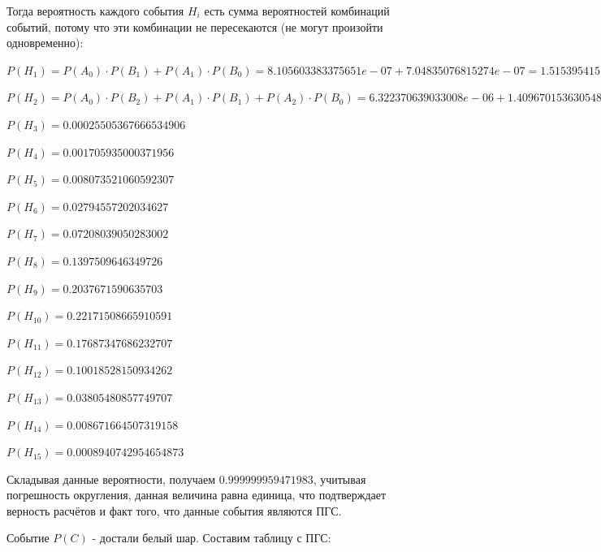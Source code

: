 \begin{enumerate}
	Тогда вероятность каждого события $H_i$ есть сумма вероятностей комбинаций событий, потому что эти комбинации не пересекаются (не могут произойти одновременно):
	
	$P(H_1) = P(A_0) \cdot P(B_1) + P(A_1) \cdot P(B_0) = 8.105603383375651e-07 + 7.04835076815274e-07 = 1.515395415152839e-06$
	
	$P(H_2) = P(A_0) \cdot P(B_2) + P(A_1) \cdot P(B_1) + P(A_2) \cdot P(B_0) = 6.322370639033008e-06 + 1.409670153630548e-05 + 5.0366339864091445e-06 = 2.5455706161747633e-05$
	
	$P(H_3) = 0.00025505367666534906$
	
	$P(H_4) = 0.001705935000371956$
	
	$P(H_5) = 0.008073521060592307$
	
	$P(H_6) = 0.02794557202034627$
	
	$P(H_7) = 0.07208039050283002$
	
	$P(H_8) = 0.1397509646349726$
	
	$P(H_9) = 0.2037671590635703$
	
	$P(H_{10}) = 0.22171508665910591$
	
	$P(H_{11}) = 0.17687347686232707$
	
	$P(H_{12}) = 0.10018528150934262$
	
	$P(H_{13}) = 0.03805480857749707$
	
	$P(H_{14}) = 0.008671664507319158$
	
	$P(H_{15}) = 0.0008940742954654873$
	
	Складывая данные вероятности, получаем $0.999999959471983$, учитывая погрешность округления, данная величина равна единица, что подтверждает верность расчётов и факт того, что данные события являются ПГС.
	
	Событие $P(C)$ - достали белый шар. Составим таблицу с ПГС:
	

\end{enumerate}
